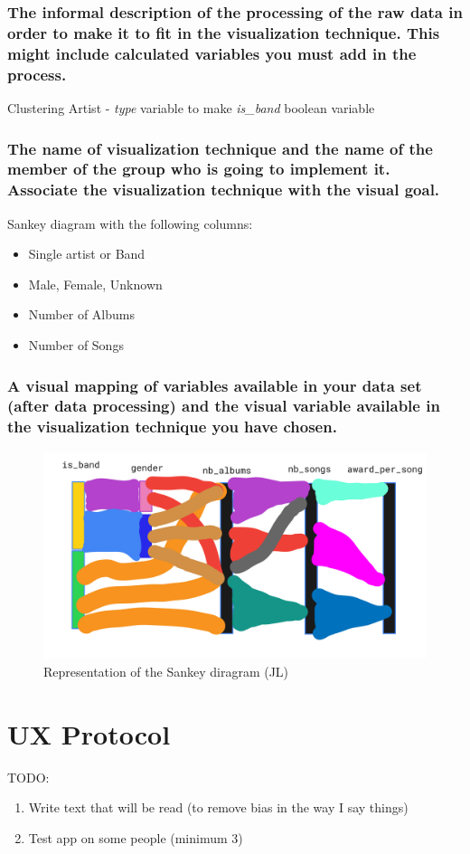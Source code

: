 \documentclass[a4paper, 11pt, oneside]{article}
\begin{document}
\subsubsection*{The informal description of the processing of the raw data in order to make it to fit in the visualization technique. This might include calculated variables you must add in the process.}
Clustering Artist - \textit{type} variable to make \textit{is\_band} boolean variable


\subsubsection*{The name of visualization technique and the name of the member of the group who is going to implement it. Associate the visualization technique with the visual goal.}
Sankey diagram with the following columns:
\begin{itemize}
    \item Single artist or Band
    \item Male, Female, Unknown
    \item Number of Albums
    \item Number of Songs
\end{itemize}

\subsubsection*{A visual mapping of variables available in your data set (after data processing) and the visual variable available in the visualization technique you have chosen.}

\begin{figure}[H]
    \centering
    \includegraphics[width=.8\textwidth]{Images/sketch_jl.png}
    \caption{Representation of the Sankey diragram (JL)}
\end{figure}

\section{UX Protocol}
TODO:
\begin{enumerate}
    \item Write text that will be read (to remove bias in the way I say things)
    \item Test app on some people (minimum 3)
\end{enumerate}
\end{document}
